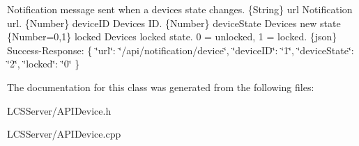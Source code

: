 Notification message sent when a device\textquotesingle{}s state changes.  \{String\} url Notification url.  \{Number\} device\+ID Device\textquotesingle{}s ID.  \{Number\} device\+State Device\textquotesingle{}s new state  \{Number=0,1\} locked Device\textquotesingle{}s locked state. 0 = unlocked, 1 = locked.  \{json\} Success-\/\+Response\+: \{ \char`\"{}url\char`\"{}\+: \char`\"{}/api/notification/device\char`\"{}, \char`\"{}device\+I\+D\char`\"{}\+: \char`\"{}1\char`\"{}, \char`\"{}device\+State\char`\"{}\+: \char`\"{}2\char`\"{}, \char`\"{}locked\char`\"{}\+: \char`\"{}0\char`\"{} \} 

The documentation for this class was generated from the following files\+:\begin{DoxyCompactItemize}
\item 
L\+C\+S\+Server/A\+P\+I\+Device.\+h\item 
L\+C\+S\+Server/A\+P\+I\+Device.\+cpp\end{DoxyCompactItemize}
